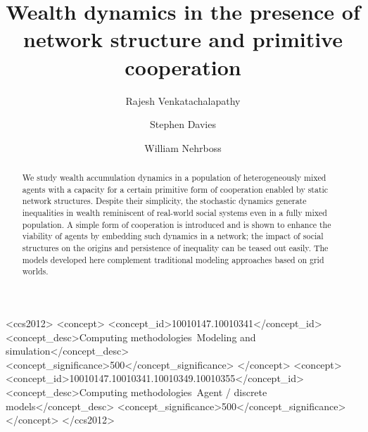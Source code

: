 \documentclass[sigconf]{acmart}
\begin{document}
\title[Wealth dynamics in the presence of network structure and primitive cooperation]{Wealth dynamics in the presence of\\network structure and primitive cooperation}

\author{Rajesh Venkatachalapathy}

\author{Stephen Davies}

\author{William Nehrboss}




\begin{abstract}
We study wealth accumulation dynamics in a population of heterogeneously mixed agents with a capacity for a certain primitive form of cooperation enabled by static network structures. Despite their simplicity, the stochastic dynamics generate inequalities in wealth reminiscent of real-world social systems even in a fully mixed population. A simple form of cooperation is introduced and is shown to enhance the viability of agents by embedding such dynamics in a network; the impact of social structures on the origins and persistence of inequality can be teased out easily. The models developed here complement traditional modeling approaches based on grid worlds.   

\end{abstract}

%
%
\begin{CCSXML}
<ccs2012>
<concept>
<concept_id>10010147.10010341</concept_id>
<concept_desc>Computing methodologies~Modeling and simulation</concept_desc>
<concept_significance>500</concept_significance>
</concept>
<concept>
<concept_id>10010147.10010341.10010349.10010355</concept_id>
<concept_desc>Computing methodologies~Agent / discrete models</concept_desc>
<concept_significance>500</concept_significance>
</concept>
</ccs2012>
\end{CCSXML}
\end{document}
